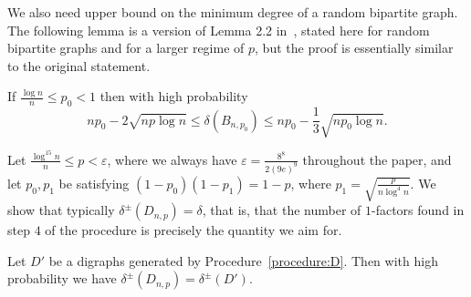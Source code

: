 \documentclass{article}
\begin{document}
	We also need  upper bound on the minimum degree of a random bipartite graph.
	The following lemma is a version of Lemma 2.2 in~\cite{krivelevich2012optimal}, stated here for random bipartite graphs and for a larger regime of $p$, but the proof is essentially similar to the original statement.
	\begin{lemma}
		\label{lem:deltaUppr}
		If $\frac{\log n}{n} \le p_0 < 1$ then with high probability
		\[np_0 - 2\sqrt{np\log n} \le \delta(B_{n,p_0}) \le np_0 - \frac{1}{3}\sqrt{np_0 \log n}. \]
	\end{lemma}
	
	
	\hspace{10pt}
	
	Let $\frac{\log^{15} n}{n} \le p < \varepsilon$, where we always have $\varepsilon = \frac{8^8}{2(9e)^9}$ throughout the paper, and let $p_0, p_1$ be satisfying $(1-p_0)(1-p_1) = 1-p$, where $p_1 = \sqrt{\frac{p}{n \log^4 n}}$.
	We show that typically $\delta^{\pm}\left(D_{n,p} \right) = \delta$, that is, that the number of $1$-factors found in step $4$ of the procedure is precisely the quantity we aim for.
	\begin{lemma}
		\label{lem:mindegDnp}
		Let $D'$ be a digraphs generated by Procedure~\ref{procedure:D}.
		Then with high probability we have $\delta^{\pm}\left(D_{n,p} \right) = \delta^{\pm}\left(D' \right)$.
	\end{lemma}
	
\end{document}
